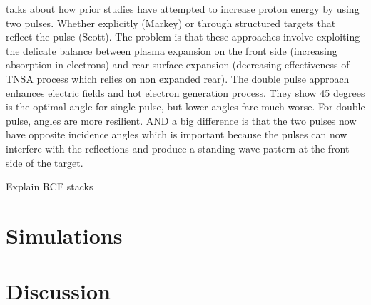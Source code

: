 \citep{Ferri_2019_Nat_Comm} talks about how prior studies have attempted to increase proton energy by using two pulses. Whether explicitly (Markey) or through structured targets that reflect the pulse (Scott). The problem is that these approaches involve exploiting the delicate balance between plasma expansion on the front side (increasing absorption in electrons) and rear surface expansion (decreasing effectiveness of TNSA process which relies on non expanded rear). The double pulse approach enhances electric fields and hot electron generation process. They show 45 degrees is the optimal angle for single pulse, but lower angles fare much worse. For double pulse, angles are more resilient. AND a big difference is that the two pulses now have opposite incidence angles which is important because the pulses can now interfere with the reflections and produce a standing wave pattern at the front side of the target. 



Explain RCF stacks
\section{Simulations}

\section{Discussion}

